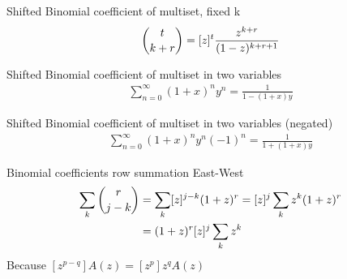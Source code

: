 \begin{identity}
    Shifted Binomial coefficient of multiset, fixed k
    \begin{align*}
        \binom{t}{k+r} = [z]^{t} \frac{z^{k+r}}{(1-z)^{k+r+1}}
    \end{align*}
\end{identity}
\begin{identity}
    Shifted Binomial coefficient of multiset in two variables~\cite[eq. 15]{faris2011generating}
    \begin{align*}
        \sum_{n=0}^{\infty} (1 + x)^n y^n = \frac{1}{1 - (1 + x)y}
    \end{align*}
\end{identity}
\begin{identity}
    Shifted Binomial coefficient of multiset in two variables (negated)
    \begin{align*}
        \sum_{n=0}^{\infty} (1 + x)^n y^n (-1)^n = \frac{1}{1 + (1 + x)y}
    \end{align*}
\end{identity}
\begin{identity}
    Binomial coefficients row summation East-West
    \begin{align*}
        \sum_{k} \binom{r}{j-k}
        &= \sum_{k} [z]^{j-k}(1+z)^r
        = [z]^{j} \sum_{k} z^k (1+z)^r \\
        &= (1+z)^r [z]^{j} \sum_{k} z^k
    \end{align*}
    Because $[z^{p-q}] A(z)=[z^p] z^{q} A(z)$
\end{identity}




\clearpage
